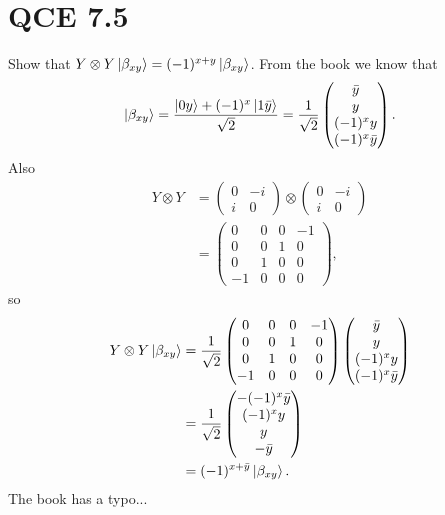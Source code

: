 \documentclass[10pt]{article}
\begin{document}
\section*{QCE 7.5}
Show that $Y \otimes Y \ket{\beta_{xy}} = (-1)^{x + y} \ket{\beta_{xy}}$.
From the book we know that 
\[
\ket{\beta_{xy}} = \frac{\ket{0y} + (-1)^x\ket{1\bar{y}}}{\sqrt{2}} 
= 
\frac{1}{\sqrt{2}}
\begin{pmatrix}
\bar{y} \\
y \\
(-1)^x y \\
(-1)^x \bar{y}
\end{pmatrix}.
\]
Also 
\begin{align*}
Y \otimes Y &= 
\begin{pmatrix}
0 & -i \\
i & 0
\end{pmatrix}
\otimes 
\begin{pmatrix}
0 & -i \\
i & 0
\end{pmatrix} \\
&= \begin{pmatrix}
0 & 0 & 0 & -1 \\
0 & 0 & 1 & 0 \\
0 & 1 & 0 & 0 \\
-1 & 0 & 0 & 0
\end{pmatrix},
\end{align*}
so
\begin{align*}
Y \otimes Y \ket{\beta_{xy}} &= 
		\frac{1}{\sqrt{2}}
		\begin{pmatrix}
        0 & 0 & 0 & -1 \\
        0 & 0 & 1 & 0 \\
        0 & 1 & 0 & 0 \\
        -1 & 0 & 0 & 0
		\end{pmatrix}
		\begin{pmatrix}
        \bar{y} \\
        y \\
        (-1)^x y \\
        (-1)^x \bar{y} \\
\end{pmatrix} \\
&= \frac{1}{\sqrt{2}}
\begin{pmatrix}
        -(-1)^x \bar{y} \\
        (-1)^x y \\
        y \\
        -\bar{y} \\
\end{pmatrix} \\
&= (-1)^{x + \bar{y}} \ket{\beta_{xy}}.
\end{align*}
The book has a typo...
\end{document}
